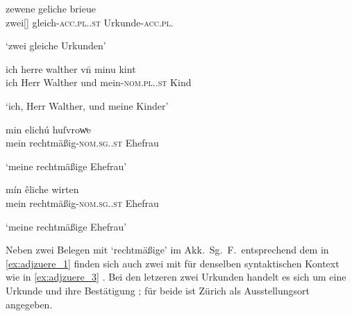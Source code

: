 \begin{exe}
\ex \label{ex:adjzuerregel}
	\begin{xlist}
	\ex \label{ex:adjzuerregel_1}
		\gll zewene geliche brieue \\
			zwei[\MascI] gleich-\textsc{acc.pl.\MascI.st}
				Urkunde-\textsc{acc.pl.\MascI} \\
		\begin{taggedline}{\parencites(Zürich, 1295)[\pno~2209, 364.33]{cao3}}
		\trans `zwei gleiche Urkunden'
		\end{taggedline}

	\ex \label{ex:adjzuerregel_2}
		\gll ich herre walther vn̄ minu kint \\
			ich Herr Walther und mein-\textsc{nom.pl.\NeutX.st} Kind \\
		\begin{taggedline}{\parencites(Hohenrain, Kt.~Luzern, 1281)[\pno~456, 396.33--34]{cao1}}
		\trans `ich, Herr Walther, und meine Kinder'
		\end{taggedline}
	\end{xlist}

\ex \label{ex:adjzueru}
	\begin{xlist}
	\ex \label{ex:adjzueru_1}
		\gll min elichú huſvrowͮe \\
			mein rechtmäßig-\textsc{nom.sg.\FemF.st} Ehefrau \\
		\begin{taggedline}{\parencites(Hohenrain, Kt.~Luzern, 1276)[\pno~260, 271.9]{cao1}}
		\trans `meine rechtmäßige Ehefrau'
		\end{taggedline}

	\ex \label{ex:adjzueru_2}
		\gll mín êliche wirten \\
			mein rechtmäßig-\textsc{nom.sg.\FemF.st} Ehefrau \\
		\begin{taggedline}{\parencites(Hohenrain, Kt.~Luzern, 1294)[\pno~1888, 173.11]{cao3}}
		\trans `meine rechtmäßige Ehefrau'
		\end{taggedline}
	\end{xlist}
\end{exe}

Neben zwei Belegen mit  `rechtmäßige' im Akk.\ Sg.\ F.\
entsprechend dem in \cref{ex:adjzuere_1} finden sich auch zwei mit 
für denselben syntaktischen Kontext wie in \cref{ex:adjzuere_3}
\autocite[vgl. dazu][270--271]{ksw2}. Bei den letzeren zwei Urkunden handelt es
sich um eine Urkunde und ihre Bestätigung \autocite[375]{caor}; für beide ist
Zürich als Ausstellungs\-ort angegeben.

